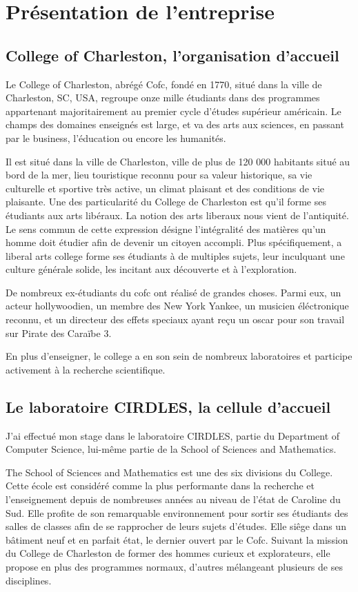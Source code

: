\part{Présentation de l'entreprise}
\chapter{College of Charleston, l'organisation d'accueil}

Le College of Charleston, abrégé Cofc, fondé en 1770, situé dans la ville de Charleston, SC, USA, regroupe onze mille étudiants dans des programmes appartenant majoritairement au premier cycle d’études supérieur américain. Le champs des domaines enseignés est large, et va des arts aux sciences, en passant par le business, l'éducation ou encore les humanités.
 
Il est situé dans la ville de Charleston, ville de plus de 120 000 habitants situé au bord de la mer, lieu touristique reconnu pour sa valeur historique, sa vie culturelle et sportive très active, un climat plaisant et des conditions de vie plaisante.
Une des particularité du College de Charleston est qu’il forme ses étudiants aux arts libéraux.  La notion des arts liberaux nous vient de l’antiquité. Le sens commun de cette expression désigne l'intégralité des matières qu’un homme doit étudier afin de devenir un citoyen accompli. Plus spécifiquement, a liberal arts college forme ses étudiants à de multiples sujets, leur inculquant une culture générale solide, les incitant aux découverte et à l’exploration.

De nombreux ex-étudiants du cofc ont réalisé de grandes choses. Parmi eux, un acteur hollywoodien, un membre des New York Yankee, un musicien éléctronique reconnu, et un directeur des effets speciaux ayant reçu un oscar pour son travail sur Pirate des Caraïbe 3.

En plus d’enseigner, le college a en son sein de nombreux laboratoires et participe activement à la recherche scientifique.

\chapter{Le laboratoire CIRDLES, la cellule d’accueil}
J’ai effectué mon stage dans le laboratoire CIRDLES, partie du Department of Computer Science, lui-même partie de la School of Sciences and Mathematics.

The School of Sciences and Mathematics est une des six divisions du College. Cette école est considéré comme la plus performante dans la recherche et l’enseignement depuis de nombreuses années au niveau de l’état de Caroline du Sud. Elle profite de son remarquable environnement pour sortir ses étudiants des salles de classes afin de se rapprocher de leurs sujets d’études. Elle siêge dans un bâtiment neuf et en parfait état, le dernier ouvert par le Cofc. Suivant la mission du College de Charleston de former des hommes curieux et explorateurs, elle propose en plus des programmes normaux, d’autres mélangeant plusieurs de ses disciplines.

